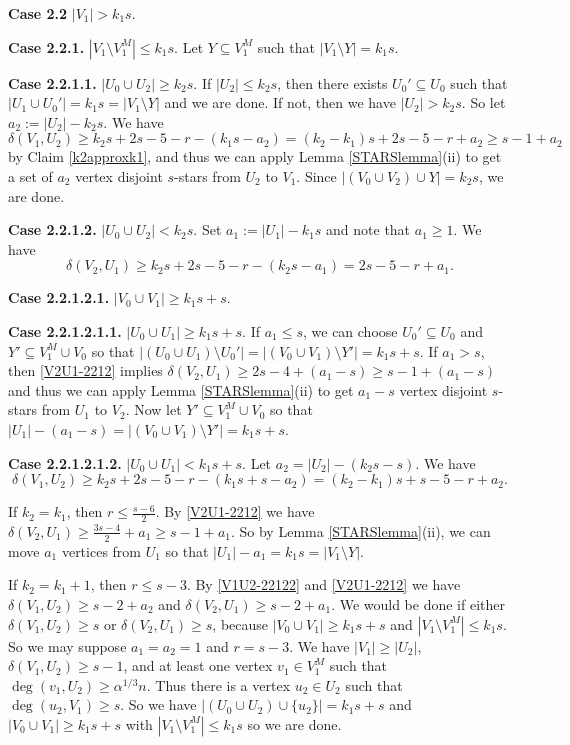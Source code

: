 \documentclass[oneside,12pt]{memoir}
\begin{document}
\textbf{Case 2.2} $|V_1|>k_1s$.

\textbf{Case 2.2.1.} $|V_1\setminus V_1^M|\leq k_1s$.  Let $Y\subseteq V_1^M$ such that $|V_1\setminus Y|=k_1s$.

\textbf{Case 2.2.1.1.} $|U_0\cup U_2|\geq k_2s$. If $|U_2|\leq k_2s$, then there exists $U_0'\subseteq U_0$ such that $|U_1\cup U_0'|=k_1s=|V_1\setminus Y|$ and we are done.  If not, then we have $|U_2|>k_2s$. So let $a_2:=|U_2|-k_2s$.  We have $\delta(V_1, U_2)\geq k_2s+2s-5-r-(k_1s-a_2)=(k_2-k_1)s+2s-5-r+a_2\geq s-1+a_2$ by Claim \ref{k2approxk1}, and thus we can apply Lemma \ref{STARSlemma}(ii) to get a set of $a_2$ vertex disjoint $s$-stars from $U_2$ to $V_1$.  Since $|(V_0\cup V_2)\cup Y|=k_2s$, we are done.  


\textbf{Case 2.2.1.2.} $|U_0\cup U_2|<k_2s$.  Set $a_1:=|U_1|-k_1s$ and note that $a_1\geq 1$.  We have \begin{equation}\label{V2U1-2212} \delta(V_2, U_1)\geq k_2s+2s-5-r-(k_2s-a_1)=2s-5-r+a_1.\end{equation}

\textbf{Case 2.2.1.2.1.} $|V_0\cup V_1|\geq k_1s+s$.

\textbf{Case 2.2.1.2.1.1.} $|U_0\cup U_1|\geq k_1s+s$. If $a_1\leq s$, we can choose $U_0'\subseteq U_0$ and $Y'\subseteq V_1^M\cup V_0$ so that $|(U_0\cup U_1)\setminus U_0'|=|(V_0\cup V_1)\setminus Y'|=k_1s+s$.  If $a_1>s$, then \eqref{V2U1-2212} implies $\delta(V_2, U_1)\geq 2s-4+(a_1-s)\geq s-1+(a_1-s)$ and thus we can apply Lemma \ref{STARSlemma}(ii) to get $a_1-s$ vertex disjoint $s$-stars from $U_1$ to $V_2$.  Now let $Y'\subseteq V_1^M\cup V_0$ so that $|U_1|-(a_1-s)=|(V_0\cup V_1)\setminus Y'|=k_1s+s$.

\textbf{Case 2.2.1.2.1.2.} $|U_0\cup U_1|<k_1s+s$.  Let $a_2=|U_2|-(k_2s-s)$.  We have 
\begin{equation}\label{V1U2-22122}
\delta(V_1, U_2)\geq k_2s+2s-5-r-(k_1s+s-a_2)=(k_2-k_1)s+s-5-r+a_2.
\end{equation}  

If $k_2=k_1$, then $r\leq \frac{s-6}{2}$.  By \eqref{V2U1-2212} we have $\delta(V_2, U_1)\geq \frac{3s-4}{2}+a_1\geq s-1+a_1$.  So by Lemma \ref{STARSlemma}(ii), we can move $a_1$ vertices from $U_1$ so that $|U_1|-a_1=k_1s=|V_1\setminus Y|$.

If $k_2=k_1+1$, then $r\leq s-3$. By \eqref{V1U2-22122} and \eqref{V2U1-2212} we have $\delta(V_1, U_2)\geq s-2+a_2$ and $\delta(V_2, U_1)\geq s-2+a_1$.  We would be done if either $\delta(V_1, U_2)\geq s$ or $\delta(V_2, U_1)\geq s$, because $|V_0\cup V_1|\geq k_1s+s$ and $|V_1\setminus V_1^M|\leq k_1s$.  So we may suppose $a_1=a_2=1$ and $r=s-3$.  We have $|V_1|\geq |U_2|$, $\delta(V_1, U_2)\geq s-1$, and at least one vertex $v_1\in V_1^M$ such that $\deg(v_1, U_2)\geq \alpha^{1/3}n$. Thus there is a vertex $u_2\in U_2$ such that $\deg(u_2, V_1)\geq s$.  So we have $|(U_0\cup U_2)\cup \{u_2\}|=k_1s+s$ and $|V_0\cup V_1|\geq k_1s+s$ with $|V_1\setminus V_1^M|\leq k_1s$ so we are done.
\end{document}
